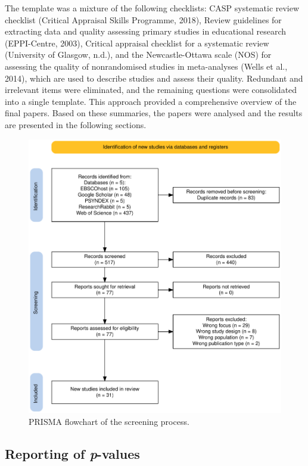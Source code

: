 \documentclass[
  stu,floatsintext]{apa7}
\begin{document}
The template was a mixture of the following checklists: CASP systematic review checklist (Critical Appraisal Skills Programme, 2018), Review guidelines for extracting data and quality assessing primary studies in educational research (EPPI-Centre, 2003), Critical appraisal checklist for a systematic review (University of Glasgow, n.d.), and the Newcastle-Ottawa scale (NOS) for assessing the quality of nonrandomised studies in meta-analyses (Wells et al., 2014), which are used to describe studies and assess their quality.
Redundant and irrelevant items were eliminated, and the remaining questions were consolidated into a single template.
This approach provided a comprehensive overview of the final papers.
Based on these summaries, the papers were analysed and the results are presented in the following sections.

\begin{figure}
\centering
\includegraphics{files/prisma.pdf}
\caption{\label{fig:prisma}PRISMA flowchart of the screening process.}
\end{figure}

\subsection{\texorpdfstring{Reporting of \emph{p}-values}{Reporting of p-values}}\label{reporting-of-p-values}
\end{document}
